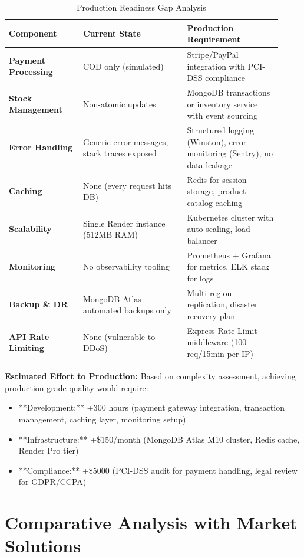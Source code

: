 \documentclass[12pt, a4paper]{report}
\begin{document}
\begin{table}[H]
\centering
\caption{Production Readiness Gap Analysis}
\label{tab:production_gaps}
\small
\begin{tabular}{@{}p{0.25\linewidth}p{0.35\linewidth}p{0.32\linewidth}@{}}
\toprule
\textbf{Component} & \textbf{Current State} & \textbf{Production Requirement} \\
\midrule
\textbf{Payment Processing} & COD only (simulated) & Stripe/PayPal integration with PCI-DSS compliance \\
\textbf{Stock Management} & Non-atomic updates & MongoDB transactions or inventory service with event sourcing \\
\textbf{Error Handling} & Generic error messages, stack traces exposed & Structured logging (Winston), error monitoring (Sentry), no data leakage \\
\textbf{Caching} & None (every request hits DB) & Redis for session storage, product catalog caching \\
\textbf{Scalability} & Single Render instance (512MB RAM) & Kubernetes cluster with auto-scaling, load balancer \\
\textbf{Monitoring} & No observability tooling & Prometheus + Grafana for metrics, ELK stack for logs \\
\textbf{Backup \& DR} & MongoDB Atlas automated backups only & Multi-region replication, disaster recovery plan \\
\textbf{API Rate Limiting} & None (vulnerable to DDoS) & Express Rate Limit middleware (100 req/15min per IP) \\
\bottomrule
\end{tabular}
\end{table}

\textbf{Estimated Effort to Production:} Based on complexity assessment, achieving production-grade quality would require:
\begin{itemize}
    \item **Development:** +300 hours (payment gateway integration, transaction management, caching layer, monitoring setup)
    \item **Infrastructure:** +\$150/month (MongoDB Atlas M10 cluster, Redis cache, Render Pro tier)
    \item **Compliance:** +\$5000 (PCI-DSS audit for payment handling, legal review for GDPR/CCPA) 
\end{itemize}

\section{Comparative Analysis with Market Solutions}
\end{document}
